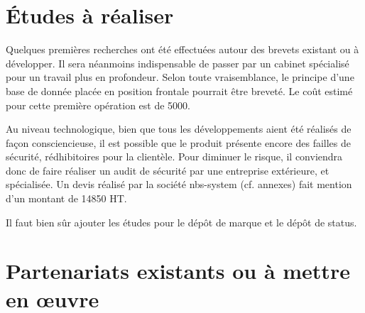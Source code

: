 \documentclass[a4paper,10pt]{scrreprt}
\begin{document}
    
    

    \section{Études à réaliser}
    
        Quelques premières recherches ont été effectuées autour des brevets existant ou à développer. Il sera néanmoins indispensable de passer par un cabinet spécialisé pour un travail plus en profondeur. Selon toute vraisemblance, le principe d'une base de donnée placée en position frontale pourrait être breveté. Le coût estimé pour cette première opération est de 5000\texteuro.
        
        \medskip
        Au niveau technologique, bien que tous les développements aient été réalisés de façon consciencieuse, il est possible que le produit présente encore des failles de sécurité, rédhibitoires pour la clientèle. Pour diminuer le risque, il conviendra donc de faire réaliser un audit de sécurité par une entreprise extérieure, et spécialisée. Un devis réalisé par la société nbs-system (cf. annexes) fait mention d'un montant de 14850\texteuro{} HT.
        
        \medskip
        Il faut bien sûr ajouter les études pour le dépôt de marque et le dépôt de status.
    
    
    
    \section{Partenariats existants ou à mettre en œuvre}
        
\end{document}
